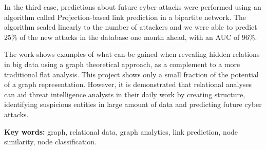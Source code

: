 In the third case, predictions about future cyber attacks were performed using an algorithm called Projection-based link prediction in a bipartite network. The algorithm scaled linearly to the number of attackers and we were able to predict 25\% of the new attacks in the database one month ahead, with an AUC of 96\%.

The work shows examples of what can be gained when revealing hidden relations in big data using a graph theoretical approach, as a complement to a more traditional flat analysis. This project shows only a small fraction of the potential of a graph representation. However, it is demonstrated that relational analyses can aid threat intelligence analysts in their daily work by creating structure, identifying suspicious entities in large amount of data and predicting future cyber attacks.

\vfill
\noindent
\textbf{Key words:} graph, relational data, graph analytics, link prediction, node similarity, node classification.